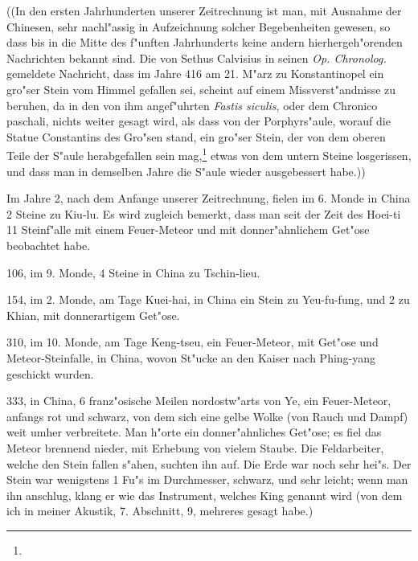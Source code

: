 \documentclass[a4paper, 11pt, oneside, polutonikogreek, german]{article}
\begin{document}
((In den ersten Jahrhunderten unserer Zeitrechnung ist man, mit Ausnahme der Chinesen, sehr nachl"assig in Aufzeichnung solcher Begebenheiten gewesen, so dass bis in die Mitte des f"unften Jahrhunderts keine andern hierhergeh"orenden Nachrichten bekannt sind. Die von Sethus Calvisius in seinen \emph{Op. Chronolog.} gemeldete Nachricht, dass im Jahre 416 am 21. M"arz zu Konstantinopel ein gro"ser Stein vom Himmel gefallen sei, scheint auf einem Missverst"andnisse zu beruhen, da in den von ihm angef"uhrten \emph{Fastis siculis}, oder dem Chronico paschali, nichts weiter gesagt wird, als dass von der Porphyrs"aule, worauf die Statue Constantins des Gro"sen stand, ein gro"ser Stein, der von dem oberen Teile der S"aule herabgefallen sein mag,\footnote{} etwas von dem untern Steine losgerissen, und dass man in demselben Jahre die S"aule wieder ausgebessert habe.))

Im Jahre 2, nach dem Anfange unserer Zeitrechnung, fielen im 6. Monde in China 2 Steine zu Kiu-lu. Es wird zugleich bemerkt, dass man seit der Zeit des Hoei-ti 11 Steinf"alle mit einem Feuer-Meteor und mit donner"ahnlichem Get"ose beobachtet habe.

106, im 9. Monde, 4 Steine in China zu Tschin-lieu.

154, im 2. Monde, am Tage Kuei-hai, in China ein Stein zu Yeu-fu-fung, und 2 zu Khian, mit donnerartigem Get"ose.

310, im 10. Monde, am Tage Keng-tseu, ein Feuer-Meteor, mit Get"ose und Meteor-Steinfalle, in China, wovon St"ucke an den Kaiser nach Phing-yang geschickt wurden.

333, in China, 6 franz"osische Meilen nordostw"arts von Ye, ein Feuer-Meteor, anfangs rot und schwarz, von dem sich eine gelbe Wolke (von Rauch und Dampf) weit umher verbreitete. Man h"orte ein donner"ahnliches Get"ose; es fiel das Meteor brennend nieder, mit Erhebung von vielem Staube. Die Feldarbeiter, welche den Stein fallen s"ahen, suchten ihn auf. Die Erde war noch sehr hei"s. Der Stein war wenigstens 1 Fu"s im Durchmesser, schwarz, und sehr leicht; wenn man ihn anschlug, klang er wie das Instrument, welches King genannt wird (von dem ich in meiner Akustik, 7. Abschnitt, 9, mehreres gesagt habe.)
\end{document}

